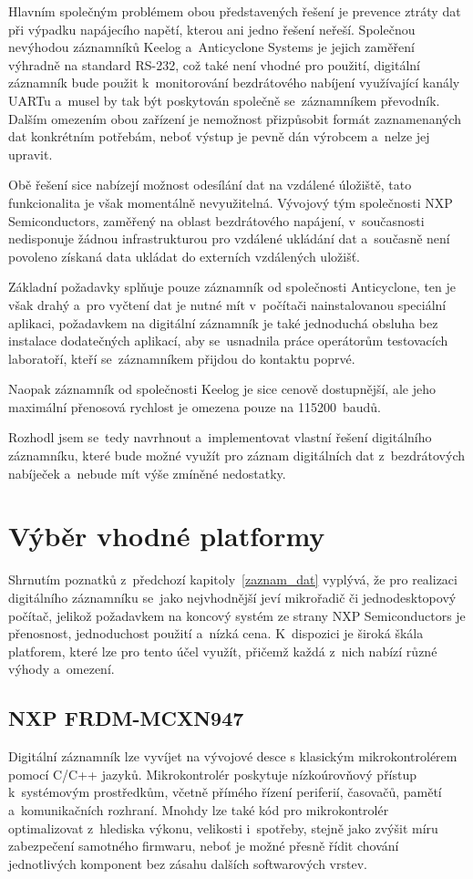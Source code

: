 Hlavním společným problémem obou představených řešení je prevence ztráty dat při výpadku napájecího napětí, kterou ani jedno řešení neřeší. Společnou nevýhodou záznamníků Keelog a~Anticyclone Systems je jejich zaměření výhradně na standard RS-232, což také není vhodné pro použití, digitální záznamník bude použit k~monitorování bezdrátového nabíjení využívající kanály UARTu a~musel by tak být poskytován společně se~záznamníkem převodník. Dalším omezením obou zařízení je nemožnost přizpůsobit formát zaznamenaných dat konkrétním potřebám, neboť výstup je pevně dán výrobcem a~nelze jej upravit.

Obě řešení sice nabízejí možnost odesílání dat na vzdálené úložiště, tato funkcionalita je však momentálně nevyužitelná. Vývojový tým společnosti NXP Semiconductors, zaměřený na oblast bezdrátového napájení, v~současnosti nedisponuje žádnou infrastrukturou pro vzdálené ukládání dat a~současně není povoleno získaná data ukládat do externích vzdálených uložišť.

Základní požadavky splňuje pouze záznamník od společnosti Anticyclone, ten je však drahý a~pro vyčtení dat je nutné mít v~počítači nainstalovanou speciální aplikaci, požadavkem na digitální záznamník je také jednoduchá obsluha bez instalace dodatečných aplikací, aby se~usnadnila práce operátorům testovacích laboratoří, kteří se~záznamníkem přijdou do kontaktu poprvé. 

Naopak záznamník od společnosti Keelog je sice cenově dostupnější, ale jeho maximální přenosová rychlost je omezena pouze na 115200~baudů.

Rozhodl jsem se~tedy navrhnout a~implementovat vlastní řešení digitálního záznamníku, které bude možné využít pro záznam digitálních dat z~bezdrátových nabíječek a~nebude mít výše zmíněné nedostatky.

\section{Výběr vhodné platformy}
\label{vyber_vhodne_platformy}
Shrnutím poznatků z~předchozí kapitoly~\ref{zaznam_dat} vyplývá, že pro realizaci digitálního záznamníku se~jako nejvhodnější jeví mikrořadič či jednodesktopový počítač, jelikož požadavkem na koncový systém ze strany NXP Semiconductors je přenosnost, jednoduchost použití a~nízká cena. K~dispozici je široká škála platforem, které lze pro tento účel využít, přičemž každá z~nich nabízí různé výhody a~omezení.

\subsection{NXP FRDM-MCXN947}
\label{nxp_frdm_mcxn947}
Digitální záznamník lze vyvíjet na vývojové desce s klasickým mikrokontrolérem pomocí C/C++ jazyků. Mikrokontrolér poskytuje nízkoúrovňový přístup k~systémovým prostředkům, včetně přímého řízení periferií, časovačů, pamětí a~komunikačních rozhraní. Mnohdy lze také kód pro mikrokontrolér optimalizovat z~hlediska výkonu, velikosti i~spotřeby, stejně jako zvýšit míru zabezpečení samotného firmwaru, neboť je možné přesně řídit chování jednotlivých komponent bez zásahu dalších softwarových vrstev.


